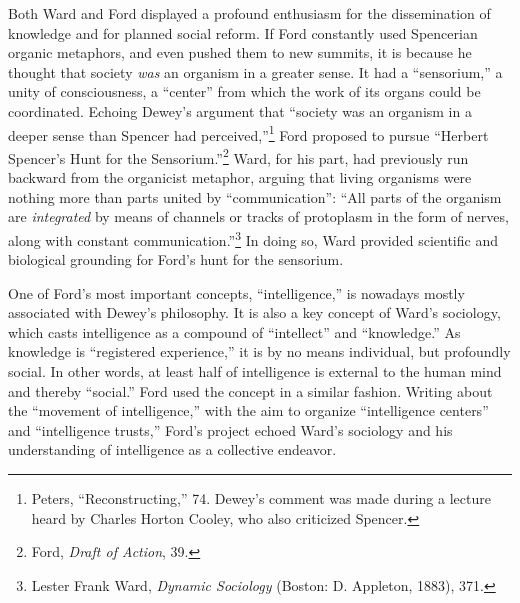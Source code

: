 \documentclass[openany,nobib]{tufte-book}
\begin{document}
Both Ward and Ford displayed a profound enthusiasm for the dissemination
of knowledge and for planned social reform. If Ford constantly used
Spencerian organic metaphors, and even pushed them to new summits, it is
because he thought that society \emph{was} an organism in a greater
sense. It had a ``sensorium,'' a unity of consciousness, a ``center''
from which the work of its organs could be coordinated. Echoing Dewey's
argument that ``society was an organism in a deeper sense than Spencer
had perceived,''\footnote{Peters, ``Reconstructing,'' 74. Dewey's
  comment was made during a lecture heard by Charles Horton Cooley, who
  also criticized Spencer.} Ford proposed to pursue ``Herbert Spencer's
Hunt for the Sensorium.''\footnote{Ford, \emph{Draft of Action}, 39.}
Ward, for his part, had previously run backward from the organicist
metaphor, arguing that living organisms were nothing more than parts
united by ``communication'': ``All parts of the organism are
\emph{integrated} by means of channels or tracks of protoplasm in the
form of nerves, along with constant communication.''\footnote{Lester
  Frank Ward, \emph{Dynamic Sociology} (Boston: D. Appleton, 1883), 371.}
In doing so, Ward provided scientific and biological grounding for
Ford's hunt for the sensorium.

One of Ford's most important concepts, ``intelligence,'' is nowadays
mostly associated with Dewey's philosophy. It is also a key concept of
Ward's sociology, which casts intelligence as a compound of
``intellect'' and ``knowledge.'' As knowledge is ``registered
experience,'' it is by no means individual, but profoundly social. In
other words, at least half of intelligence is external to the human mind
and thereby ``social.'' Ford used the concept in a similar fashion.
Writing about the ``movement of intelligence,'' with the aim to organize
``intelligence centers'' and ``intelligence trusts,'' Ford's project
echoed Ward's sociology and his understanding of intelligence as a
collective endeavor.
\end{document}
